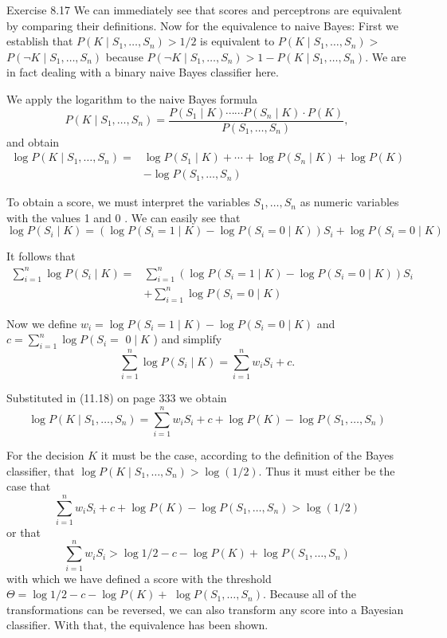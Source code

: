 \documentclass[10pt]{book}
\begin{document}
Exercise 8.17 We can immediately see that scores and perceptrons are equivalent by comparing their definitions. Now for the equivalence to naive Bayes: First we establish that $P\left(K \mid S_{1}, \ldots, S_{n}\right)>1 / 2$ is equivalent to $P\left(K \mid S_{1}, \ldots, S_{n}\right)>$ $P\left(\neg K \mid S_{1}, \ldots, S_{n}\right)$ because $P\left(\neg K \mid S_{1}, \ldots, S_{n}\right)>1-P\left(K \mid S_{1}, \ldots, S_{n}\right)$. We are in fact dealing with a binary naive Bayes classifier here.

We apply the logarithm to the naive Bayes formula
$$
P\left(K \mid S_{1}, \ldots, S_{n}\right)=\frac{P\left(S_{1} \mid K\right) \cdots \cdots P\left(S_{n} \mid K\right) \cdot P(K)}{P\left(S_{1}, \ldots, S_{n}\right)},
$$
and obtain
$$
\begin{align*}
\log P\left(K \mid S_{1}, \ldots, S_{n}\right)= & \log P\left(S_{1} \mid K\right)+\cdots+\log P\left(S_{n} \mid K\right)+\log P(K) \\
& -\log P\left(S_{1}, \ldots, S_{n}\right) \tag{11.18}
\end{align*}
$$

To obtain a score, we must interpret the variables $S_{1}, \ldots, S_{n}$ as numeric variables with the values 1 and 0 . We can easily see that
$$
\log P\left(S_{i} \mid K\right)=\left(\log P\left(S_{i}=1 \mid K\right)-\log P\left(S_{i}=0 \mid K\right)\right) S_{i}+\log P\left(S_{i}=0 \mid K\right)
$$

It follows that
$$
\begin{aligned}
\sum_{i=1}^{n} \log P\left(S_{i} \mid K\right)= & \sum_{i=1}^{n}\left(\log P\left(S_{i}=1 \mid K\right)-\log P\left(S_{i}=0 \mid K\right)\right) S_{i} \\
& +\sum_{i=1}^{n} \log P\left(S_{i}=0 \mid K\right)
\end{aligned}
$$

Now we define $w_{i}=\log P\left(S_{i}=1 \mid K\right)-\log P\left(S_{i}=0 \mid K\right)$ and $c=\sum_{i=1}^{n} \log P\left(S_{i}=\right.$ $0 \mid K$ ) and simplify
$$
\sum_{i=1}^{n} \log P\left(S_{i} \mid K\right)=\sum_{i=1}^{n} w_{i} S_{i}+c .
$$

Substituted in (11.18) on page 333 we obtain
$$
\log P\left(K \mid S_{1}, \ldots, S_{n}\right)=\sum_{i=1}^{n} w_{i} S_{i}+c+\log P(K)-\log P\left(S_{1}, \ldots, S_{n}\right)
$$

For the decision $K$ it must be the case, according to the definition of the Bayes classifier, that $\log P\left(K \mid S_{1}, \ldots, S_{n}\right)>\log (1 / 2)$. Thus it must either be the case that
$$
\sum_{i=1}^{n} w_{i} S_{i}+c+\log P(K)-\log P\left(S_{1}, \ldots, S_{n}\right)>\log (1 / 2)
$$
or that
$$
\sum_{i=1}^{n} w_{i} S_{i}>\log 1 / 2-c-\log P(K)+\log P\left(S_{1}, \ldots, S_{n}\right)
$$
with which we have defined a score with the threshold $\Theta=\log 1 / 2-c-\log P(K)+$ $\log P\left(S_{1}, \ldots, S_{n}\right)$. Because all of the transformations can be reversed, we can also transform any score into a Bayesian classifier. With that, the equivalence has been shown.
\end{document}
